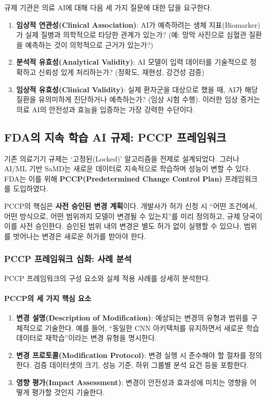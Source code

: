 규제 기관은 의료 AI에 대해 다음 세 가지 질문에 대한 답을 요구한다.

\begin{enumerate}
 \item \textbf{임상적 연관성(Clinical Association)}: AI가 예측하려는 생체 지표(Biomarker)가 실제 질병과 의학적으로 타당한 관계가 있는가? (예: 망막 사진으로 심혈관 질환을 예측하는 것이 의학적으로 근거가 있는가?)
 \item \textbf{분석적 유효성(Analytical Validity)}: AI 모델이 입력 데이터를 기술적으로 정확하고 신뢰성 있게 처리하는가? (정확도, 재현성, 강건성 검증)
 \item \textbf{임상적 유효성(Clinical Validity)}: 실제 환자군을 대상으로 했을 때, AI가 해당 질환을 유의미하게 진단하거나 예측하는가? (임상 시험 수행). 이러한 임상 증거는 의료 AI의 안전성과 효능을 입증하는 가장 강력한 수단이다\cite{rajpurkar2022ai}.
\end{enumerate}

\subsection{FDA의 지속 학습 AI 규제: PCCP 프레임워크}
\label{sec:16.1.4}

기존 의료기기 규제는 `고정된(Locked)' 알고리즘을 전제로 설계되었다. 그러나 AI/ML 기반 SaMD는 새로운 데이터로 지속적으로 학습하며 성능이 변할 수 있다. FDA는 이를 위해 \textbf{PCCP\allowbreak{}(Pre\-determined Change Control Plan)} 프레임워크를 도입하였다.

PCCP의 핵심은 \textbf{사전 승인된 변경 계획}이다. 개발사가 허가 신청 시 ``어떤 조건에서, 어떤 방식으로, 어떤 범위까지 모델이 변경될 수 있는지''를 미리 정의하고, 규제 당국이 이를 사전 승인한다. 승인된 범위 내의 변경은 별도 허가 없이 실행할 수 있으나, 범위를 벗어나는 변경은 새로운 허가를 받아야 한다.

\subsubsection{PCCP 프레임워크 심화: 사례 분석}

PCCP 프레임워크의 구성 요소와 실제 적용 사례를 상세히 분석한다.

\paragraph{PCCP의 세 가지 핵심 요소}
\begin{enumerate}
 \item \textbf{변경 설명(Description of Modification)}: 예상되는 변경의 유형과 범위를 구체적으로 기술한다. 예를 들어, ``동일한 CNN 아키텍처를 유지하면서 새로운 학습 데이터로 재학습''이라는 변경 유형을 명시한다.
 \item \textbf{변경 프로토콜(Modification Protocol)}: 변경 실행 시 준수해야 할 절차를 정의한다. 검증 데이터셋의 크기, 성능 기준, 하위 그룹별 분석 요건 등을 포함한다.
 \item \textbf{영향 평가(Impact Assessment)}: 변경이 안전성과 효과성에 미치는 영향을 어떻게 평가할 것인지 기술한다.
\end{enumerate}

